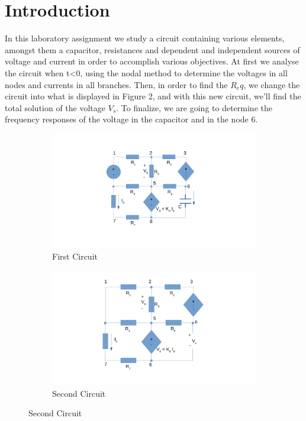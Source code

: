 \newpage
\section{Introduction}
\label{sec:introduction}

In this laboratory assignment we study a circuit containing various elements, amongst them a capacitor, resistances and dependent and independent sources of voltage and current in order to accomplish various objectives. At first we analyse the circuit when t<0, using the nodal method to determine the voltages in all nodes and currents in all branches. Then, in order to find the $R_eq$, we change the circuit into what is displayed in Figure 2, and with this new circuit, we'll find the total solution of the voltage $V_s$. To finalize, we are going to determine the frequency responses of the voltage in the capacitor and in the node 6. 

\begin{figure}[h] 
\centering
\begin{subfigure}{0.4\textwidth}
\includegraphics[width=\textwidth]{circuit1.pdf}
\caption{First Circuit}
\label{fig:first}
\end{subfigure}
\begin{subfigure}{0.4\textwidth}
\includegraphics[width=\textwidth]{circuit2.pdf}
\caption{Second Circuit}
\label{fig:second}
\end{subfigure}
\end{figure}


